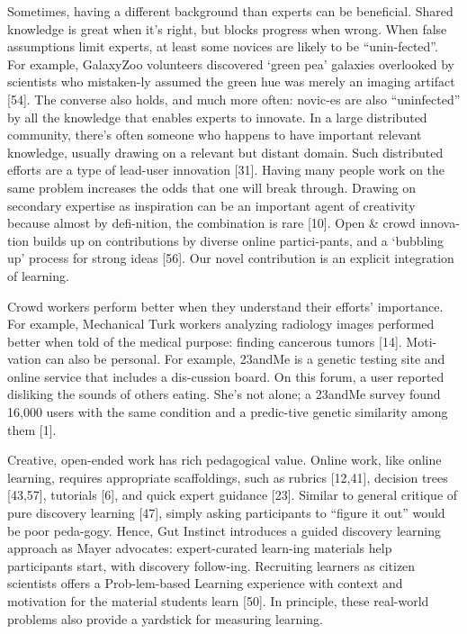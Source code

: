 Sometimes, having a different background than experts can be beneficial. Shared knowledge is great when it’s right, but blocks progress when wrong. When false assumptions limit experts, at least some novices are likely to be “unin-fected”. For example, GalaxyZoo volunteers discovered ‘green pea’ galaxies overlooked by scientists who mistaken-ly assumed the green hue was merely an imaging artifact [54]. The converse also holds, and much more often: novic-es are also “uninfected” by all the knowledge that enables experts to innovate. In a large distributed community, there’s often someone who happens to have important relevant knowledge, usually drawing on a relevant but distant domain. Such distributed efforts are a type of lead-user innovation [31]. Having many people work on the same problem increases the odds that one will break through. Drawing on secondary expertise as inspiration can be an important agent of creativity because almost by defi-nition, the combination is rare [10]. Open \& crowd innova-tion builds up on contributions by diverse online partici-pants, and a ‘bubbling up’ process for strong ideas [56]. Our novel contribution is an explicit integration of learning.

Crowd workers perform better when they understand their efforts’ importance. For example, Mechanical Turk workers analyzing radiology images performed better when told of the medical purpose: finding cancerous tumors [14]. Moti-vation can also be personal. For example, 23andMe is a genetic testing site and online service that includes a dis-cussion board. On this forum, a user reported disliking the sounds of others eating. She’s not alone; a 23andMe survey found 16,000 users with the same condition and a predic-tive genetic similarity among them [1].

Creative, open-ended work has rich pedagogical value. Online work, like online learning, requires appropriate scaffoldings, such as rubrics [12,41], decision trees [43,57], tutorials [6], and quick expert guidance [23]. Similar to general critique of pure discovery learning [47], simply asking participants to “figure it out” would be poor peda-gogy. Hence, Gut Instinct introduces a guided discovery learning approach as Mayer advocates: expert-curated learn-ing materials help participants start, with discovery follow-ing. Recruiting learners as citizen scientists offers a Prob-lem-based Learning experience with context and motivation for the material students learn [50]. In principle, these real-world problems also provide a yardstick for measuring learning. 

